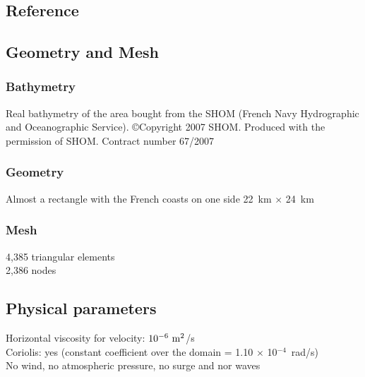 \subsection{Reference}
%

%
%
%
\subsection{Geometry and Mesh}
%
\subsubsection{Bathymetry}
%
Real bathymetry of the area bought from the SHOM (French Navy
Hydrographic and Oceanographic Service).
\copyright Copyright 2007 SHOM. Produced with the permission of SHOM.
Contract number 67/2007
%
\subsubsection{Geometry}
%
Almost a rectangle with the French coasts on one side
22~km $\times$ 24~km
%
\subsubsection{Mesh}
%
4,385 triangular elements\\
2,386 nodes\\
%
%
%
\subsection{Physical parameters}
%
Horizontal viscosity for velocity: $10^{-6}~\rm{m}^2$/s\\
Coriolis: yes (constant coefficient over the domain
= 1.10 $\times$ 10$^{-4}$~rad/s)\\
No wind, no atmospheric pressure, no surge and nor waves
%
%
%
%
%
%

